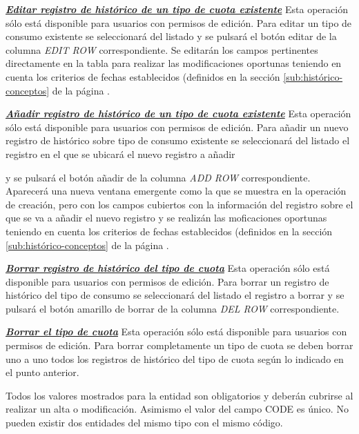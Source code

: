 \underline{\textsl{\textbf{Editar registro de histórico de un tipo de cuota existente}}}\newline
Esta operación sólo está disponible para usuarios con permisos de edición.
Para editar un tipo de consumo existente se seleccionará del listado y se pulsará el botón editar de la columna \textit{EDIT ROW} correspondiente. Se editarán los campos pertinentes directamente en la tabla para realizar las modificaciones oportunas teniendo en cuenta los criterios de fechas establecidos (definidos en la sección \ref{sub:histórico-conceptos} de la página \pageref{sub:histórico-conceptos}.

\underline{\textsl{\textbf{Añadir registro de histórico de un tipo de cuota existente}}}\newline
Esta operación sólo está disponible para usuarios con permisos de edición.
Para añadir un nuevo registro de histórico sobre tipo de consumo existente se seleccionará del listado el registro en el que se ubicará el nuevo registro a añadir 

y se pulsará el botón añadir de la columna \textit{ADD ROW} correspondiente. Aparecerá una nueva ventana emergente como la que se muestra en la operación de creación, pero con los campos cubiertos con la información del registro sobre el que se va a añadir el nuevo registro y se realizán las moficaciones oportunas teniendo en cuenta los criterios de fechas establecidos (definidos en la sección \ref{sub:histórico-conceptos} de la página \pageref{sub:histórico-conceptos}.

\underline{\textsl{\textbf{Borrar registro de histórico del tipo de cuota}}}\newline
Esta operación sólo está disponible para usuarios con permisos de edición.
Para borrar un registro de histórico del tipo de consumo se seleccionará del listado el registro a borrar y se pulsará el botón amarillo de borrar de la columna \textit{DEL ROW} correspondiente.\newline

\underline{\textsl{\textbf{Borrar el tipo de cuota}}}\newline
Esta operación sólo está disponible para usuarios con permisos de edición.
Para borrar completamente un tipo de cuota se deben borrar uno a uno todos los registros de histórico del tipo de cuota según lo indicado en el punto anterior. 

Todos los valores mostrados para la entidad son obligatorios y deberán cubrirse al realizar un alta o modificación. Asimismo el valor del campo CODE es único. No pueden existir dos entidades del mismo tipo con el mismo código.


